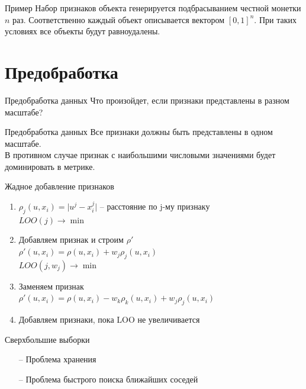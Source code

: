 \documentclass[10pt]{beamer}
\begin{document}
\begin{frame}{Пример}
	Набор признаков объекта генерируется подбрасыванием честной монетки $n$ раз. Соответственно
	каждый объект описывается вектором $[0, 1]^n$. При таких условиях все объекты будут равноудалены.
\end{frame}

\section{Предобработка}

\begin{frame}{Предобработка данных}
	\centering
	Что произойдет, если признаки представлены в разном масштабе?
\end{frame}

\begin{frame}{Предобработка данных}
	Все признаки должны быть представлены \alert{в одном масштабе}. \\
	В противном случае признак с наибольшими числовыми значениями будет доминировать в метрике.
\end{frame}

\begin{frame}{Жадное добавление признаков}
	\begin{enumerate} 
		\item ${\rho_j(u, x_i) = \vert u^j - x_i^j \vert}$ -- расстояние по j-му признаку\\
		          $LOO(j) \rightarrow \min$\\
		\item Добавляем признак и строим $\rho'$\\
							${\rho'(u, x_i) = \rho(u, x_i) + w_j\rho_j(u, x_i)}$\\
							$LOO(j, w_j) \rightarrow \min$\\
		\item Заменяем признак\\
            		${\rho'(u, x_i) = \rho(u, x_i) - w_k\rho_k(u, x_i) + w_j\rho_j(u, x_i)}$\\
		\item Добавляем признаки, пока LOO не увеличивается
	\end{enumerate}
\end{frame}

\begin{frame}{Сверхбольшие выборки}
	\begin{itemize} [<+- | alert@+>]
		\item[--] Проблема хранения
		\item[--] Проблема быстрого поиска ближайших соседей
	\end{itemize}
\end{frame}
\end{document}
